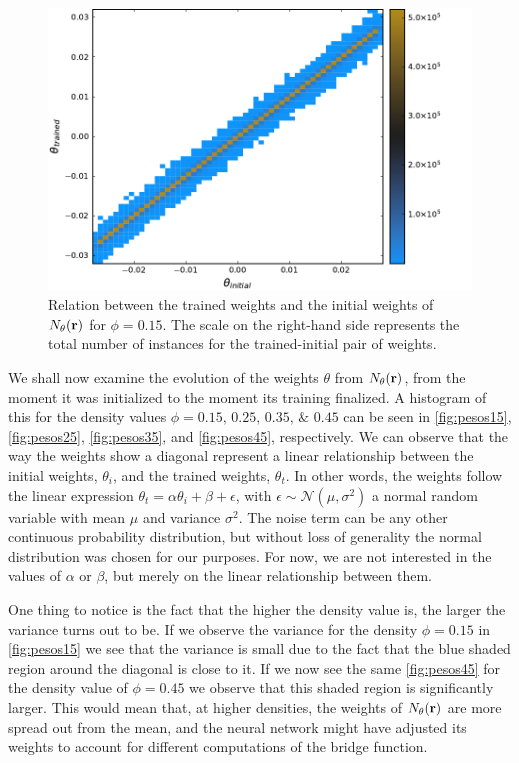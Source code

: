 \begin{figure}[t]
    \includegraphics[width=\textwidth]{figuras/capitulo-3/weights_phi=0.15.pdf}
    \caption[Comparison between weights, $\phi=0.15$.]{Relation between the trained weights and the initial weights of $N_{\theta}(\mathbf{r})$ for $\phi=0.15$. The scale on the right-hand side represents the total number of instances for the trained-initial pair of weights.} 
    \label{fig:pesos15}
\end{figure}

We shall now examine the evolution of the weights $\theta$ from
$N_{\theta}(\mathbf{r})$, from the moment it was initialized to the moment its training finalized.
A histogram of this for the density values 
$\phi=\numlist[list-final-separator={\; \text{and} \;}]{0.15;0.25;0.35;0.45}$ 
can be seen in \autoref{fig:pesos15}, \autoref{fig:pesos25}, \autoref{fig:pesos35}, 
and \autoref{fig:pesos45}, respectively.
We can observe that the way the weights show a diagonal represent a linear relationship 
between the initial weights, $\theta_{i}$, and the trained weights, $\theta_{t}$. In other 
words, the weights follow the linear expression
$\theta_{t} = \alpha \theta_{i} + \beta + \epsilon$, with
$\epsilon \sim \mathcal{N}(\mu, \sigma^{2})$ a normal random variable with mean
$\mu$ and variance $\sigma^2$. The noise term can be any other continuous probability 
distribution, but without loss of generality the normal distribution was chosen for
our purposes. For now, we are not interested in the values of $\alpha$ or $\beta$,
but merely on the linear relationship between them.

One thing to notice is the fact that the higher the density value is, the larger
the variance turns out to be. If we observe the variance for the density
$\phi=0.15$ in \autoref{fig:pesos15}
we see that the variance is small due to the fact that the blue shaded region around
the diagonal is close to it. If we now see the same \autoref{fig:pesos45} for the 
density value of $\phi=0.45$ we observe that this shaded region is significantly larger.
This would mean that, at higher densities, the weights of $N_{\theta}(\mathbf{r})$ are more spread out
from the mean, and the neural network might have adjusted its weights to account for
different computations of the bridge function.

